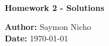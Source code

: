 \begin{titlepage}
    \centering
    \vspace*{2cm}
    {\Large \textbf{\college}}\\[1.5em]
    {\large \textbf{\faculty}}
    \vspace{5cm}

    {\huge \textbf{\courseTitle}}
    \vspace{1cm}

    {\Large \textbf{Homework 2 - Solutions}}
    \vspace{2cm}

    \textbf{Author:} Saymon Nicho \\[1.5em]
    \textbf{Date:} \today \\[5em]

    \vfill
\end{titlepage}
